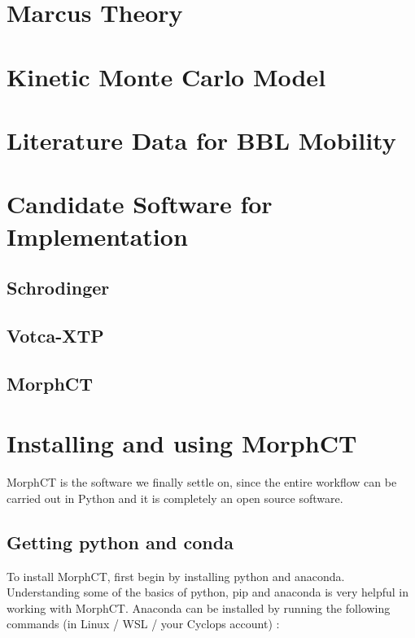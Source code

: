 \documentclass{article}
\begin{document}
\section{Marcus Theory}


\section{Kinetic Monte Carlo Model}

\section{Literature Data for BBL Mobility}

\section{Candidate Software for Implementation}

\subsection{Schrodinger}

\subsection{Votca-XTP}

\subsection{MorphCT}


\section{Installing and using MorphCT}

MorphCT is the software we finally settle on, since the entire workflow can be carried out in Python and it is completely an open source software. 

\subsection{Getting python and conda}

To install MorphCT, first begin by installing python and anaconda. Understanding some of the basics of python, pip and anaconda is very helpful in working with MorphCT. Anaconda can be installed by running the following commands (in Linux / WSL / your Cyclops account) :
\end{document}
